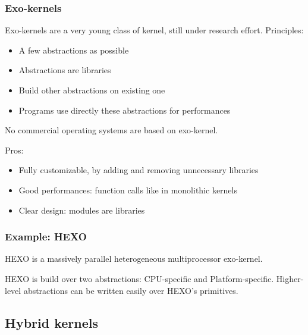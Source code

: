 \begin{frame}
  \frametitle{Exo-kernels}

  Exo-kernels are a very young class of kernel, still under research effort. Principles:

  \begin{itemize}
  \item
    A few abstractions as possible
  \item
    Abstractions are libraries
  \item
    Build other abstractions on existing one
  \item
    Programs use directly these abstractions for performances
  \end{itemize}

  \-

  No commercial operating systems are based on exo-kernel.

  \-

  Pros:

  \begin{itemize}
  \item
    Fully customizable, by adding and removing unnecessary libraries
  \item
    Good performances: function calls like in monolithic kernels
  \item
    Clear design: modules are libraries
  \end{itemize}

\end{frame}

%
%

\begin{frame}
  \frametitle{Example: HEXO}

  HEXO is a massively parallel heterogeneous multiprocessor exo-kernel.

  \begin{center}
  \end{center}

  HEXO is build over two abstractions: CPU-specific and
  Platform-specific. Higher-level abstractions can be written easily over HEXO's primitives.

\end{frame}

%
%

\subsection{Hybrid kernels}

